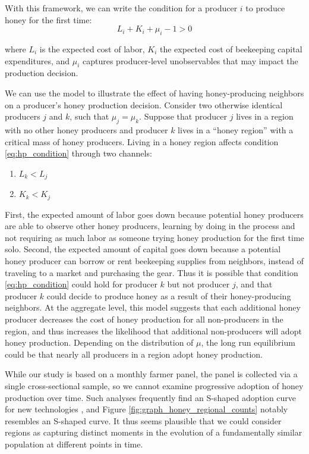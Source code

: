 \documentclass[../main.tex]{subfiles}
\begin{document}
With this framework, we can write the condition for a producer $i$ to produce honey for the first time: 
\begin{equation}
\label{eq:hp_condition}
    L_i + K_i + \mu_i - 1 > 0
\end{equation}

where $L_i$ is the expected cost of labor, $K_i$ the expected cost of beekeeping capital expenditures, and $\mu_i$ captures producer-level unobservables that may impact the production decision.

We can use the model to illustrate the effect of
having honey-producing neighbors on a producer's honey production
decision. Consider two otherwise identical producers $j$ and $k$, such that $\mu_j = \mu_k$. Suppose that producer $j$ lives in a region with no other honey producers and producer $k$ lives in a ``honey region'' with a critical mass of honey producers. Living in a honey region affects condition \ref{eq:hp_condition} through two channels:
\begin{enumerate}
    \item $L_k < L_j$
    \item $K_k < K_j$
\end{enumerate}

First, the expected amount of labor goes down because potential honey producers are able to observe other honey producers, learning by doing in the process and not requiring as much labor as someone trying honey production for the first time solo. Second, the expected amount of capital goes down because a potential honey producer can borrow or rent beekeeping supplies from neighbors, instead of traveling to a market and purchasing the gear. Thus it is possible that condition \ref{eq:hp_condition} could hold for producer $k$ but not producer $j$, and that producer $k$ could decide to produce honey as a result of their honey-producing neighbors. At the aggregate level, this model suggests that each additional honey producer decreases the cost of honey production for all non-producers in the region, and thus increases the likelihood that additional non-producers will adopt honey production. Depending on the distribution of $\mu$, the long run equilibrium could be that nearly all producers in a region
adopt honey production. 

While our study is based on a monthly farmer panel, the panel is collected via a single cross-sectional sample, so we cannot
examine progressive adoption of honey production over time.
Such analyses frequently find an S-shaped adoption curve for new technologies \parencite{grilichesHybridCornExploration1957, federAdoptionAgriculturalInnovations1985}, and Figure \ref{fig:graph_honey_regional_counts} notably resembles an S-shaped curve. It thus seems plausible that we could consider regions as capturing distinct moments in the evolution of a fundamentally similar population at different points in time.
\end{document}
